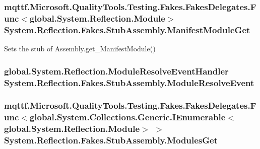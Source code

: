 \hypertarget{class_system_1_1_reflection_1_1_fakes_1_1_stub_assembly_a721f5f3123f0a49d3e080d72f8f5f50e}{
\subsubsection[{Manifest\-Module\-Get}]{\setlength{\rightskip}{0pt plus 5cm}mqttf.\-Microsoft.\-Quality\-Tools.\-Testing.\-Fakes.\-Fakes\-Delegates.\-Func$<$global.\-System.\-Reflection.\-Module$>$ System.\-Reflection.\-Fakes.\-Stub\-Assembly.\-Manifest\-Module\-Get}}\label{class_system_1_1_reflection_1_1_fakes_1_1_stub_assembly_a721f5f3123f0a49d3e080d72f8f5f50e}


Sets the stub of Assembly.\-get\-\_\-\-Manifest\-Module()

\hypertarget{class_system_1_1_reflection_1_1_fakes_1_1_stub_assembly_aa6bc2b3b802ba7df2df6867471eff813}{
\subsubsection[{Module\-Resolve\-Event}]{\setlength{\rightskip}{0pt plus 5cm}global.\-System.\-Reflection.\-Module\-Resolve\-Event\-Handler System.\-Reflection.\-Fakes.\-Stub\-Assembly.\-Module\-Resolve\-Event}}\label{class_system_1_1_reflection_1_1_fakes_1_1_stub_assembly_aa6bc2b3b802ba7df2df6867471eff813}
\hypertarget{class_system_1_1_reflection_1_1_fakes_1_1_stub_assembly_ab319326c51e76e814bf1dd894a84eadb}{
\subsubsection[{Modules\-Get}]{\setlength{\rightskip}{0pt plus 5cm}mqttf.\-Microsoft.\-Quality\-Tools.\-Testing.\-Fakes.\-Fakes\-Delegates.\-Func$<$global.\-System.\-Collections.\-Generic.\-I\-Enumerable$<$global.\-System.\-Reflection.\-Module$>$ $>$ System.\-Reflection.\-Fakes.\-Stub\-Assembly.\-Modules\-Get}}\label{class_system_1_1_reflection_1_1_fakes_1_1_stub_assembly_ab319326c51e76e814bf1dd894a84eadb}


